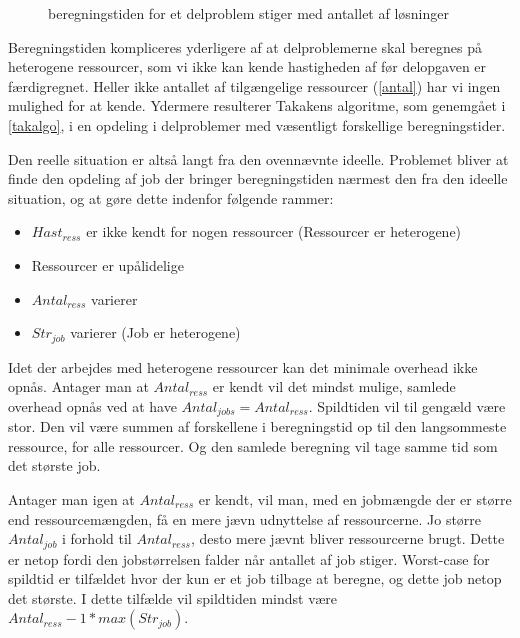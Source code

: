 \documentclass[pdf,draft,a4paper,11pt]{article}
\begin{document}
\begin{figure}

\caption{beregningstiden for et delproblem stiger med antallet af løsninger}
\label{fig:tidstigermedloesninger}
\end{figure}




Beregningstiden kompliceres yderligere af at delproblemerne skal beregnes på heterogene ressourcer, som vi ikke kan kende hastigheden af før delopgaven er færdigregnet. Heller ikke antallet af tilgængelige ressourcer (\ref{antal}) har vi ingen mulighed for at kende. Ydermere resulterer Takakens algoritme, som genemgået i \ref{takalgo}, i en opdeling i delproblemer med væsentligt forskellige beregningstider.

Den reelle situation er altså langt fra den ovennævnte ideelle. Problemet bliver at finde den opdeling af job der bringer beregningstiden nærmest den fra den ideelle situation, og at gøre dette indenfor følgende rammer:
\begin{itemize}
	\item $Hast_{ress}$ er ikke kendt for nogen ressourcer (Ressourcer er heterogene)  
	\item Ressourcer er upålidelige
	\item $Antal_{ress}$ varierer
	\item $Str_{job}$ varierer (Job er heterogene)
\end{itemize}

Idet der arbejdes med heterogene ressourcer kan det minimale overhead ikke opnås. 
Antager man at $Antal_{ress}$ er kendt vil det mindst mulige, samlede overhead opnås ved at have $Antal_{jobs} = Antal_{ress}$. Spildtiden vil til gengæld være stor. Den vil være summen af forskellene i beregningstid op til den langsommeste ressource, for alle ressourcer. Og den samlede beregning vil tage samme tid som det største job.

Antager man igen at $Antal_{ress}$ er kendt, vil man, med en jobmængde der er større end ressourcemængden, få en mere jævn udnyttelse af ressourcerne. Jo større $Antal_{job}$ i forhold til $Antal_{ress}$, desto mere jævnt bliver ressourcerne brugt. Dette er netop fordi den jobstørrelsen falder når antallet af job stiger. Worst-case for spildtid er tilfældet hvor der kun er et job tilbage at beregne, og dette job netop det største. I dette tilfælde vil spildtiden mindst være $Antal_{ress} - 1 * max(Str_{job})$.
\end{document}
